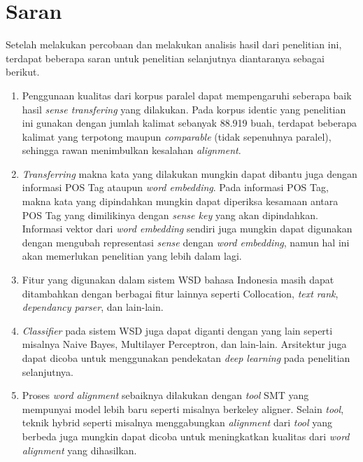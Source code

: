 \section{Saran}
Setelah melakukan percobaan dan melakukan analisis hasil dari penelitian ini, terdapat beberapa saran untuk penelitian selanjutnya diantaranya sebagai berikut.

\begin{enumerate}
	\item Penggunaan kualitas dari korpus paralel dapat mempengaruhi seberapa baik hasil \textit{sense transfering} yang dilakukan. Pada korpus identic yang penelitian ini gunakan dengan jumlah kalimat sebanyak 88.919 buah, terdapat beberapa kalimat yang terpotong maupun \textit{comparable} (tidak sepenuhnya paralel), sehingga rawan menimbulkan kesalahan \textit{alignment}.
	\item \textit{Transferring} makna kata yang dilakukan mungkin dapat dibantu juga dengan informasi POS Tag ataupun \textit{word embedding}. Pada informasi POS Tag, makna kata yang dipindahkan mungkin dapat diperiksa kesamaan antara POS Tag yang dimilikinya dengan \textit{sense key} yang akan dipindahkan. Informasi vektor dari \textit{word embedding} sendiri juga mungkin dapat digunakan dengan mengubah representasi \textit{sense} dengan \textit{word embedding}, namun hal ini akan memerlukan penelitian yang lebih dalam lagi.
	\item Fitur yang digunakan dalam sistem WSD bahasa Indonesia masih dapat ditambahkan dengan berbagai fitur lainnya seperti Collocation, \textit{text rank}, \textit{dependancy parser}, dan lain-lain.
	\item \textit{Classifier} pada sistem WSD juga dapat diganti dengan yang lain seperti misalnya Naive Bayes, Multilayer Perceptron, dan lain-lain. Arsitektur juga dapat dicoba untuk menggunakan pendekatan \textit{deep learning} pada penelitian selanjutnya.
	\item Proses \textit{word alignment} sebaiknya dilakukan dengan \textit{tool} SMT yang mempunyai model lebih baru seperti misalnya berkeley aligner. Selain \textit{tool}, teknik hybrid seperti misalnya menggabungkan \textit{alignment} dari \textit{tool} yang berbeda juga mungkin dapat dicoba untuk meningkatkan kualitas dari \textit{word alignment} yang dihasilkan.
\end{enumerate}